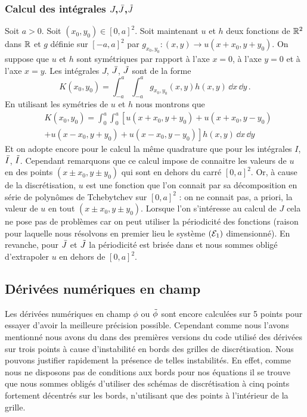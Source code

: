 \documentclass[10.5pt]{article}
\begin{document}
\begin{multicols}{2}
\subsubsection{Calcul des intégrales $J$,$\bar{J}$,$\tilde{J}$ }
\label{sec:IntJ}

Soit $a>0$. Soit $(x_0,y_0) \in [0,a]^2$. Soit maintenant $u$ et $h$ deux fonctions de $\mathbb{R}^2$ dans $\mathbb{R}$ et  $g$ définie sur $[-a, a]^2$  par $g_{x_0, y_0} : (x,y) \rightarrow u(x+x_0, y+y_0)$. On suppose que $u$ et $h$ sont symétriques par rapport à l'axe $x=0$, à l'axe $y=0$ et à l'axe $x=y$. Les intégrales $J$, $\bar{J}$, $\tilde{J}$ sont de la forme 
\begin{equation}
K(x_0,y_0) = \int_{-a}^{a} \int_{-a}^{a} g_{x_0, y_0}(x,y) h(x,y) \,  \dd x \, \dd y 	 \, .
\end{equation}
En utilisant les symétries de $u$ et $h$ nous montrons que
\begin{equation}
\begin{split}
& K(x_0,y_0) = \int_{0}^{a}  \int_{0}^{a}  \left[ u(x+x_0, y+y_0) + u(x+x_0, y-y_0) \right. \\
 & +  \left. u(x-x_0, y+y_0) + u(x-x_0, y-y_0)\right] h(x,y)  \, \dd x \, \dd y 
\end{split}
\end{equation}
Et on adopte encore pour le calcul la même quadrature que pour les intégrales $I$, $\bar{I}$, $\tilde{I}$. Cependant remarquons que ce calcul impose de connaitre les valeurs de $u$ en des points $(x \pm x_0, y \pm y_0)$ qui sont en dehors du carré $[0, a]^2$. Or, à cause de la discrétisation, $u$ est une fonction que l'on connait par sa décomposition en série de polynômes de Tchebytchev sur $[0,a]^2$ : on ne connait pas, a priori, la valeur de $u$ en tout $(x\pm x_0, y\pm y_0)$. Lorsque l'on s'intéresse au calcul de $J$ cela ne pose pas de problèmes car on peut utiliser la périodicité des fonctions (raison pour laquelle nous résolvons en premier lieu le système $(\mathcal{E}_1)$ dimensionné). En revanche, pour $\bar{J}$ et $\tilde{J}$ la périodicité est brisée dans et nous sommes obligé d'extrapoler $u$ en dehors de $[0,a]^2$. 





\subsection{Dérivées numériques en champ }

Les dérivées numériques en champ $\phi$ ou $\tilde{\phi}$ sont encore calculées sur 5 points pour essayer d'avoir la meilleure  précision possible. Cependant comme nous l'avons mentionné nous avons du dans des premières versions du code utilisé des dérivées sur trois points à cause d'instabilité en bords des grilles de discrétisation. Nous pouvons justifier rapidement la présence de telles instabilités. En effet, comme nous ne disposons pas de conditions aux bords pour nos équations il se trouve que nous sommes obligés d'utiliser des schémas de discrétisation à cinq points fortement décentrés sur les bords, n'utilisant que des points à l'intérieur de la grille.\\



\end{multicols}
\end{document}

